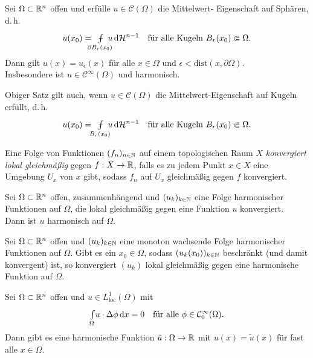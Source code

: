 \documentclass{cheat-sheet}
\newcommand{\HM}{\mathcal{H}} %
\newcommand{\dist}{\mathrm{dist}} %
\def\Xint#1{\mathchoice
   {\XXint\displaystyle\textstyle{#1}}%
   {\XXint\textstyle\scriptstyle{#1}}%
   {\XXint\scriptstyle\scriptscriptstyle{#1}}%
   {\XXint\scriptscriptstyle\scriptscriptstyle{#1}}%
   \!\int}
\def\XXint#1#2#3{{\setbox0=\hbox{$#1{#2#3}{\int}$}
     \vcenter{\hbox{$#2#3$}}\kern-.5\wd0}}
\def\dashint{\Xint-}
\newcommand{\mymvint}[2]{{\textstyle \dashint\limits_{#1}^{#2}}}
\newcommand{\MVInt}[4]{\mymvint{#1}{#2} #3 \,\d #4}
\begin{document}


\begin{satz}
  Sei $\Omega \subset \mathbb{R}^n$ offen und erfülle $u \in \mathcal{C}(\Omega)$ die Mittelwert- Eigenschaft auf Sphären, d.\,h.
  \[
    u(x_0) = \enspace\MVInt{\mathclap{\partial B_r(x_0)}}{}{\enspace u}{\HM^{n-1}}
    \quad \text{für alle Kugeln $B_r(x_0) \Subset \Omega$.}
  \]
  Dann gilt $u(x) = u_\epsilon(x)$ für alle $x \in \Omega$ und $\epsilon < \dist(x, \partial \Omega)$.\\
  Insbesondere ist $u \in \mathcal{C}^\infty(\Omega)$ und harmonisch.
\end{satz}

\begin{kor}
  Obiger Satz gilt auch, wenn $u \in \mathcal{C}(\Omega)$ die Mittelwert-Eigenschaft auf Kugeln erfüllt, d.\,h.
  \[
    u(x_0) = \enspace\MVInt{\mathclap{B_r(x_0)}}{}{\enspace u}{\HM^{n-1}}
    \quad \text{für alle Kugeln $B_r(x_0) \Subset \Omega$.}
  \]
\end{kor}

\begin{defn}
  Eine Folge von Funktionen $(f_n)_{n \in \mathbb{N}}$ auf einem topologischen Raum $X$ \emph{konvergiert lokal gleichmäßig} gegen $f : X \to \mathbb{R}$, falls es zu jedem Punkt $x \in X$ eine Umgebung $U_x$ von $x$ gibt, sodass $f_n$ auf $U_x$ gleichmäßig gegen $f$ konvergiert.
\end{defn}

\begin{kor}
  Sei $\Omega \subset \mathbb{R}^n$ offen, zusammenhängend und $(u_k)_{k \in \mathbb{N}}$ eine Folge harmonischer Funktionen auf $\Omega$, die lokal gleichmäßig gegen eine Funktion $u$ konvergiert.\\
  Dann ist $u$ harmonisch auf $\Omega$.
\end{kor}

\begin{kor}
  Sei $\Omega \subset \mathbb{R}^n$ offen und $(u_k)_{k \in \mathbb{N}}$ eine monoton wachsende Folge harmonischer Funktionen auf $\Omega$. Gibt es ein $x_0 \in \Omega$, sodass $(u_k(x_0))_{k \in \mathbb{N}}$ beschränkt (und damit konvergent) ist, so konvergiert $(u_k)$ lokal gleichmäßig gegen eine harmonische Funktion auf $\Omega$.
\end{kor}

\begin{satz}
  Sei $\Omega \subset \mathbb{R}^n$ offen und $u \in L_{\text{loc}}^1(\Omega)$ mit
  \[
    {\textstyle \int\limits_{\Omega}^{}} u \cdot \Delta \phi \,\mathrm{d} x = 0
    \quad \text{für alle $\phi \in \mathcal{C}_0^\infty(\Omega)$.}
  \]
  Dann gibt es eine harmonische Funktion $\tilde{u} : \Omega \to \mathbb{R}$ mit $u(x) = \tilde{u}(x)$ für fast alle $x \in \Omega$.
\end{satz}
\end{document}
